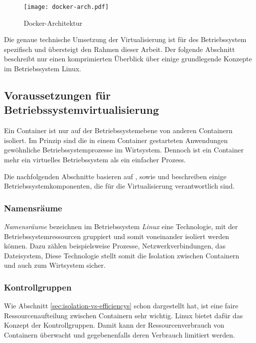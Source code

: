\begin{figure}[!hbt]%
\centering
\texttt{[image: docker-arch.pdf]}%
\caption{Docker-Architektur}%
\label{fig:docker-arch}%
\end{figure}

Die genaue technische Umsetzung der Virtualisierung ist für des Betriebssystem spezifisch und übersteigt den Rahmen dieser Arbeit. Der folgende Abschnitt beschreibt nur einen komprimierten Überblick über einige grundlegende Konzepte im Betriebssystem Linux.

\subsection{Voraussetzungen für Betriebssystemvirtualisierung}
\label{subsec:docker-tech}

Ein Container ist nur auf der Betriebssystemebene von anderen Containern isoliert. Im Prinzip sind die in einem Container gestarteten Anwendungen  gewöhnliche Betriebssystemprozesse im Wirtsystem. Dennoch ist ein Container mehr ein virtuelles Betriebssystem als ein einfacher Prozess.

Die nachfolgenden Abschnitte basieren auf \cite{Merkel:2014:DLL:2600239.2600241}, sowie \cite{DBLP:journals/corr/Bui15} und beschreiben einige Betriebssystemkomponenten, die für die Virtualisierung verantwortlich sind.

\subsubsection{Namensräume}

\textit{Namensräume} bezeichnen im Betriebssystem \textit{Linux} eine Technologie, mit der Betriebssystemressourcen gruppiert und somit voneinander isoliert werden können. Dazu zählen beispielsweise Prozesse, Netzwerkverbindungen, das Dateisystem, \usw Diese Technologie stellt somit die Isolation zwischen Containern und auch zum Wirtsystem sicher.

\subsubsection{Kontrollgruppen}

Wie Abschnitt \ref{sec:isolation-vs-efficiencys} schon dargestellt hat, ist eine faire Ressourcenaufteilung zwischen Containern sehr wichtig. Linux bietet dafür das Konzept der Kontrollgruppen. Damit kann der Ressourcenverbrauch von Containern überwacht und gegebenenfalls deren Verbrauch limitiert werden.

